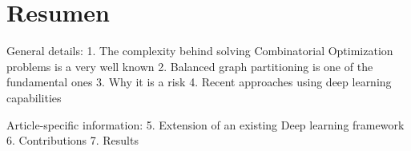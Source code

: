 

\chapter*{Resumen}

General details:
1. The complexity behind solving Combinatorial Optimization problems is a very well known 
2. Balanced graph partitioning is one of the fundamental ones
3. Why it is a risk
4. Recent approaches using deep learning capabilities

Article-specific information:
5. Extension of an existing Deep learning framework
6. Contributions
7. Results

\clearpage